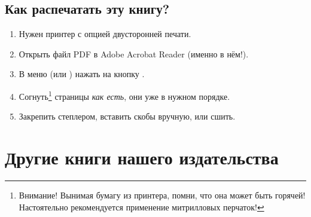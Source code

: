 \documentclass[14pt]{memoir}
\begin{document}
\subsection{Как распечатать эту книгу?}

\renewcommand{\thefootnote}{\fnsymbol{footnote}}

\begin{enumerate}
    \item Нужен принтер с опцией двусторонней печати.
    \item Открыть файл PDF в Adobe Acrobat Reader (именно в нём!).
    \item В меню  (или ) нажать на кнопку .
    \item Согнуть\footnote[2]{Внимание! Вынимая бумагу из принтера, помни, что она может быть горячей! Настоятельно рекомендуется применение митрилловых перчаток!} страницы \emph{как есть}, они уже в нужном порядке.
    \item Закрепить степлером, вставить скобы вручную, или сшить.
\end{enumerate}


\cleartoverso
\thispagestyle{empty}  %


\section*{Другие книги нашего издательства}
\vspace{2cm}
\end{document}

